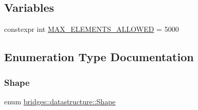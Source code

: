 \subsection*{Variables}
\begin{DoxyCompactItemize}
\item 
constexpr int \hyperlink{namespacebridges_1_1datastructure_a2e75baaa66b6c9cd3f5c5f598b2c8147}{M\+A\+X\+\_\+\+E\+L\+E\+M\+E\+N\+T\+S\+\_\+\+A\+L\+L\+O\+W\+ED} = 5000
\end{DoxyCompactItemize}


\subsection{Enumeration Type Documentation}
\mbox{\label{namespacebridges_1_1datastructure_a3408f5f44d9c6062e5f3adb7e1bbb7f0}} 
\subsubsection{\texorpdfstring{Shape}{Shape}}
{\footnotesize\ttfamily enum \hyperlink{namespacebridges_1_1datastructure_a3408f5f44d9c6062e5f3adb7e1bbb7f0}{bridges\+::datastructure\+::\+Shape}}

